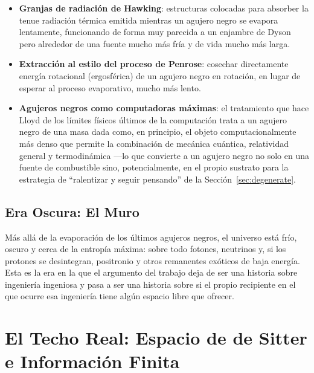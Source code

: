 \documentclass[11pt]{article}
\begin{document}
\begin{itemize}[leftmargin=1.5em]
    \item \textbf{Granjas de radiación de Hawking}: estructuras colocadas para absorber la tenue radiación térmica emitida mientras un agujero negro se evapora lentamente, funcionando de forma muy parecida a un enjambre de Dyson pero alrededor de una fuente mucho más fría y de vida mucho más larga.
    \item \textbf{Extracción al estilo del proceso de Penrose}: cosechar directamente energía rotacional (ergosférica) de un agujero negro en rotación, en lugar de esperar al proceso evaporativo, mucho más lento.
    \item \textbf{Agujeros negros como computadoras máximas}: el tratamiento que hace Lloyd de los límites físicos últimos de la computación \citep{lloyd2000ultimate} trata a un agujero negro de una masa dada como, en principio, el objeto computacionalmente más denso que permite la combinación de mecánica cuántica, relatividad general y termodinámica —lo que convierte a un agujero negro no solo en una fuente de combustible sino, potencialmente, en el propio sustrato para la estrategia de ``ralentizar y seguir pensando'' de la Sección~\ref{sec:degenerate}.
\end{itemize}

\subsection{Era Oscura: El Muro}
\label{sec:dark}

Más allá de la evaporación de los últimos agujeros negros, el universo está frío, oscuro y cerca de la entropía máxima: sobre todo fotones, neutrinos y, si los protones se desintegran, positronio y otros remanentes exóticos de baja energía. Esta es la era en la que el argumento del trabajo deja de ser una historia sobre ingeniería ingeniosa y pasa a ser una historia sobre si el propio recipiente en el que ocurre esa ingeniería tiene algún espacio libre que ofrecer.

\section{El Techo Real: Espacio de de Sitter e Información Finita}
\label{sec:ceiling}
\end{document}
